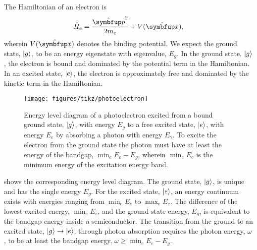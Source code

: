 The Hamiltonian of an electron is
\begin{equation}
	\hat{H}_e
	=
	\frac{\vu{p}^2}{2m_e}
	+
	V(\vu{x})
	,
\end{equation}
wherein $V(\vu{x})$ denotes the binding potential.
We expect the ground state, $\lvert g\rangle$, to be an energy eigenstate with eigenvalue, $E_g$.
In the ground state, $\lvert g\rangle$, the electron is bound and dominated by the potential term in the Hamiltonian.
In an excited state, $\lvert e\rangle$, the electron is approximately free and dominated by the kinetic term in the Hamiltonian.
\begin{figure}[htb]
    \centering
    \texttt{[image: figures/tikz/photoelectron]}
    \caption{Energy level diagram of a photoelectron excited from a bound ground state, $\lvert g\rangle$, with energy $E_g$ to a free excited state, $\lvert e\rangle$, with energy $E_e$ by absorbing a photon with energy $E_\gamma$. To excite the electron from the ground state the photon must have at least the energy of the bandgap, $\min_eE_e-E_g$, wherein $\min_eE_e$ is the minimum energy of the excitation energy band.}\label{fig:photoelectron}
\end{figure}
 shows the corresponding energy level diagram.
The ground state, $\lvert g\rangle$, is unique and has the single energy $E_g$.
For the excited state, $\lvert e\rangle$, an energy continuum exists with energies ranging from $\min_eE_e$ to $\max_eE_e$.
The difference of the lowest excited energy, $\min_eE_e$, and the ground state energy, $E_g$, is equivalent to the bandgap energy inside a semiconductor.
The transition from the ground to an excited state, $\lvert g\rangle\to\lvert e\rangle$, through photon absorption requires the photon energy, $\omega$, to be at least the bandgap energy, $\omega\geq\min_eE_e-E_g$.

